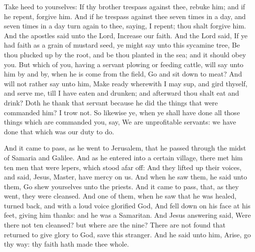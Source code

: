  Take heed to yourselves: If thy brother trespass against
thee, rebuke him; and if he repent, forgive him.  And if
he trespass against thee seven times in a day, and seven times in a day
turn again to thee, saying, I repent; thou shalt forgive him.
 And the apostles said unto the Lord, Increase our faith.
 And the Lord said, If ye had faith as a grain of mustard
seed, ye might say unto this sycamine tree, Be thou plucked up by the
root, and be thou planted in the sea; and it should obey you.
 But which of you, having a servant plowing or feeding
cattle, will say unto him by and by, when he is come from the field, Go
and sit down to meat?  And will not rather say unto him,
Make ready wherewith I may sup, and gird thyself, and serve me, till I
have eaten and drunken; and afterward thou shalt eat and drink?
 Doth he thank that servant because he did the things that
were commanded him? I trow not.  So likewise ye, when ye
shall have done all those things which are commanded you, say, We are
unprofitable servants: we have done that which was our duty to do.

 And it came to pass, as he went to Jerusalem, that he
passed through the midst of Samaria and Galilee.  And as
he entered into a certain village, there met him ten men that were
lepers, which stood afar off:  And they lifted up their
voices, and said, Jesus, Master, have mercy on us.  And
when he saw them, he said unto them, Go shew yourselves unto the
priests. And it came to pass, that, as they went, they were cleansed.
 And one of them, when he saw that he was healed, turned
back, and with a loud voice glorified God,  And fell down
on his face at his feet, giving him thanks: and he was a Samaritan.
 And Jesus answering said, Were there not ten cleansed?
but where are the nine?  There are not found that
returned to give glory to God, save this stranger.  And
he said unto him, Arise, go thy way: thy faith hath made thee whole.

